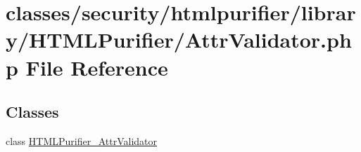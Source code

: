 \hypertarget{AttrValidator_8php}{\section{classes/security/htmlpurifier/library/\+H\+T\+M\+L\+Purifier/\+Attr\+Validator.php File Reference}
\label{AttrValidator_8php}
}
\subsection*{Classes}
\begin{DoxyCompactItemize}
\item 
class \hyperlink{classHTMLPurifier__AttrValidator}{H\+T\+M\+L\+Purifier\+\_\+\+Attr\+Validator}
\end{DoxyCompactItemize}
